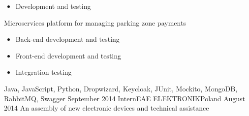 \begin{experiences}
{                        \begin{itemize}
                            \item Development and testing
                        \end{itemize}
                        Microservices platform for managing parking zone payments
                        \begin{itemize}
                            \item Back-end development and testing
                            \item Front-end development and testing
                            \item Integration testing
                        \end{itemize}
                    }
                    {Java, JavaScript, Python, Dropwizard, Keycloak, JUnit, Mockito, MongoDB, RabbitMQ, Swagger}
  \emptySeparator
  \emptyexperience
  {September 2014}      {Intern}{EAE ELEKTRONIK}{Poland}
  {August 2014}     {An assembly of new electronic devices and technical assistance}

\end{experiences}
